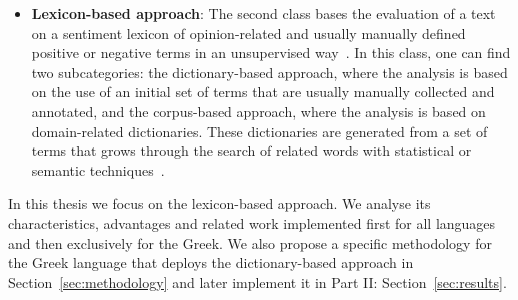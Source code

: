 \begin{itemize}
 \item \textbf{Lexicon-based approach}:
 The second class bases the evaluation of a text on a sentiment lexicon
 of opinion-related and usually manually defined positive or negative terms
 in an unsupervised way~\cite{SORH15,GSZ13,Tur02}.
 In this class, one can find two subcategories:
 the dictionary-based approach,
 where the analysis is based on the use of an initial set of terms
 that are usually manually collected and annotated,
 and the corpus-based approach, where the analysis is based
 on domain-related dictionaries.
 These dictionaries are generated from a set of terms
 that grows through the search of related words
 with statistical or semantic techniques~\cite{SORH15}.
 
\end{itemize}

In this thesis we focus on the lexicon-based approach.
We analyse its characteristics, advantages and related work
implemented first for all languages and then exclusively for the Greek.
We also propose a specific methodology for the Greek language
that deploys the dictionary-based approach in Section~\ref{sec:methodology}
and later implement it in Part II: Section~\ref{sec:results}.
